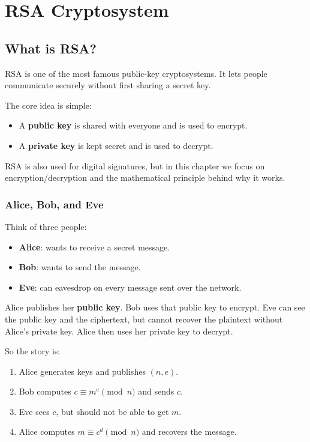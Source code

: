 \chapter{RSA Cryptosystem}

\section{What is RSA?}
RSA is one of the most famous public-key cryptosystems. It lets people
communicate securely without first sharing a secret key.

The core idea is simple:
\begin{itemize}
  \item A \textbf{public key} is shared with everyone and is used to encrypt.
  \item A \textbf{private key} is kept secret and is used to decrypt.
\end{itemize}

RSA is also used for digital signatures, but in this chapter we focus on
encryption/decryption and the mathematical principle behind why it works.

\subsection*{Alice, Bob, and Eve}
Think of three people:
\begin{itemize}
  \item \textbf{Alice}: wants to receive a secret message.
  \item \textbf{Bob}: wants to send the message.
  \item \textbf{Eve}: can eavesdrop on every message sent over the network.
\end{itemize}

Alice publishes her \textbf{public key}. Bob uses that public key to encrypt.
Eve can see the public key and the ciphertext, but cannot recover the plaintext
without Alice's private key. Alice then uses her private key to decrypt.

So the story is:
\begin{enumerate}
  \item Alice generates keys and publishes \((n,e)\).
  \item Bob computes \(c\equiv m^e\pmod n\) and sends \(c\).
  \item Eve sees \(c\), but should not be able to get \(m\).
  \item Alice computes \(m\equiv c^d\pmod n\) and recovers the message.
\end{enumerate}

